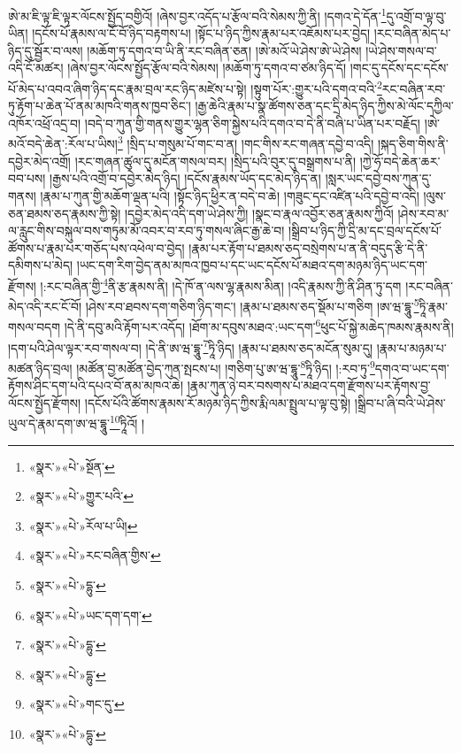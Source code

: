 ཨེ་མ་ཇི་ལྟ་ཇི་ལྟར་ལོངས་སྤྱོད་བགྱིའོ། །ཞེས་བྱར་འདོད་པ་རྩོལ་བའི་སེམས་ཀྱི་ནི། །དགའ་དེ་དོན་\footnote{«སྣར་»«པེ་»སྔོན་}དུ་འགྲོ་བ་ལྟ་བུ་ཡིན། །དངོས་པོ་རྣམས་ལ་ངོ་བོ་ཉིད་བརྟགས་པ། །སྟོང་པ་ཉིད་ཀྱིས་རྣམ་པར་འཇོམས་པར་བྱེད། །རང་བཞིན་མེད་པ་ཉིད་དུ་སྦྱོར་བ་ལས། །མཆོག་ཏུ་དགའ་བ་ཡི་ནི་རང་བཞིན་ཅན། །ཨེ་མའོ་ཡེ་ཤེས་ཨེ་ཡེ་ཤེས། །ཡེ་ཤེས་གསལ་བ་འདི་ངོ་མཚར། །ཞེས་བྱར་ལོངས་སྤྱོད་རྩོལ་བའི་སེམས། །མཆོག་ཏུ་དགའ་བ་ཙམ་ཉིད་དོ། །གང་དུ་དངོས་དང་དངོས་པོ་མེད་པ་འབའ་ཞིག་ཉིད་དང་རྣམ་བྲལ་རང་ཉིད་མཛེས་པ་སྟེ། །སྟུག་པོར་:གྱུར་པའི་དགའ་བའི་\footnote{«སྣར་»«པེ་»གྱུར་པའི་}རང་བཞིན་རབ་ཏུ་རྟོག་པ་ཆེན་པོ་ནམ་མཁའི་གནས་ཁྱབ་ཅིང་། །རྒྱ་ཆེའི་རྣམ་པ་སྣ་ཚོགས་ཅན་དང་དྲི་མེད་ཉིད་ཀྱིས་མེ་ལོང་དཀྱིལ་འཁོར་འཕྲོ་འདྲ་བ། །བདེ་བ་ཀུན་གྱི་གནས་གྱུར་ལྷན་ཅིག་སྐྱེས་པའི་དགའ་བ་དེ་ནི་བཞི་པ་ཡིན་པར་བརྗོད། །ཨེ་མའོ་བདེ་ཆེན་:རོལ་པ་ཡིས།\footnote{«སྣར་»«པེ་»རོལ་པ་ཡི།} །སྲིད་པ་གསུམ་པོ་གང་བ་ན། །གང་གིས་རང་གཞན་དབྱེ་བ་འདི། །སྐད་ཅིག་གིས་ནི་དབྱེར་མེད་འགྲོ། །རང་གཞན་ཚུལ་དུ་མངོན་གསལ་བར། །སྲིད་པའི་བུར་དུ་བསྒྲགས་པ་ནི། །ཀྱེ་ཧོ་བདེ་ཆེན་ཆར་བབ་པས། །རྒྱས་པའི་འགྲོ་བ་དབྱེར་མེད་ཉིད། །དངོས་རྣམས་ཡོད་དང་མེད་ཉིད་ན། །སླར་ཡང་དབྱེ་བས་ཀུན་དུ་གནས། །རྣམ་པ་ཀུན་གྱི་མཆོག་ལྡན་པའི། །སྟོང་ཉིད་ཕྱིར་ན་བདེ་བ་ཆེ། །གཟུང་དང་འཛིན་པའི་དབྱེ་བ་འདི། །ལུས་ཅན་ཐམས་ཅད་རྣམས་ཀྱི་སྟེ། །དབྱེར་མེད་འདི་དག་ཡེ་ཤེས་ཀྱི། །སྣང་བ་རྣལ་འབྱོར་ཅན་རྣམས་ཀྱིའོ། །ཤེས་རབ་མ་ལ་རླུང་གིས་བསྐུལ་བས་གཏུམ་མོ་འབར་བ་རབ་ཏུ་གསལ་ཞིང་རྒྱ་ཆེ་བ། །སྒྲིབ་པ་ཉིད་ཀྱི་དྲི་མ་དང་བྲལ་དངོས་པོ་ཚོགས་པ་རྣམ་པར་གཅོད་པས་འཕེལ་བ་བྱེད། །རྣམ་པར་རྟོག་པ་ཐམས་ཅད་བསྲེགས་པ་ན་ནི་བདུད་རྩི་དེ་ནི་དམིགས་པ་མེད། །ཡང་དག་རིག་བྱེད་ནམ་མཁའ་ཁྱབ་པ་དང་ཡང་དངོས་པོ་མཐའ་དག་མཉམ་ཉིད་ཡང་དག་རྫོགས། །:རང་བཞིན་གྱི་\footnote{«སྣར་»«པེ་»རང་བཞིན་གྱིས་}ནི་རྩ་རྣམས་ནི། །དེ་ཁོ་ན་ལས་ལྷ་རྣམས་མིན། །འདི་རྣམས་ཀྱི་ནི་ཤིན་ཏུ་དག །རང་བཞིན་མེད་འདི་རང་ངོ་བོ། །ཤེས་རབ་ཐབས་དག་གཅིག་ཉིད་གང་། །རྣམ་པ་ཐམས་ཅད་སྡོམ་པ་གཅིག །ཨ་ཝ་དྷཱུ་\footnote{«སྣར་»«པེ་»དྷུ་}ཏཱི་རྣམ་གསལ་བདག །དེ་ནི་དབུ་མའི་རྟོག་པར་འདོད། །ཐོག་མ་དབུས་མཐའ་:ཡང་དག་\footnote{«སྣར་»«པེ་»ཡང་དག་དག་}ཕུང་པོ་སྐྱེ་མཆེད་ཁམས་རྣམས་ནི། །དག་པའི་ཤེལ་ལྟར་རབ་གསལ་བ། །དེ་ནི་ཨ་ཝ་དྷཱུ་\footnote{«སྣར་»«པེ་»དྷུ་}ཏཱི་ཉིད། །རྣམ་པ་ཐམས་ཅད་མངོན་སུམ་དུ། །རྣམ་པ་མཉམ་པ་མཚན་ཉིད་བྲལ། །མཚོན་བྱ་མཚོན་བྱེད་ཀུན་སྤངས་པ། །གཅིག་པུ་ཨ་ཝ་དྷཱུ་\footnote{«སྣར་»«པེ་»དྷུ་}ཏཱི་ཉིད། །:རབ་ཏུ་\footnote{«སྣར་»«པེ་»གང་དུ་}དགའ་བ་ཡང་དག་རྟོགས་ཤིང་དག་པའི་དཔའ་བོ་ནམ་མཁའ་ཆེ། །རྣམ་ཀུན་ཉེ་བར་བསགས་པ་མཐའ་དག་རྫོགས་པར་རྟོགས་བྱ་ལོངས་སྤྱོད་རྫོགས། །དངོས་པོའི་ཚོགས་རྣམས་རོ་མཉམ་ཉིད་ཀྱིས་རྨི་ལམ་སྤྲུལ་པ་ལྟ་བུ་སྟེ། །སྒྲིབ་པ་ཞི་བའི་ཡེ་ཤེས་ཡུལ་དེ་རྣམ་དག་ཨ་ཝ་དྷཱུ་\footnote{«སྣར་»«པེ་»དྷུ་}ཏཱིའོ། །
